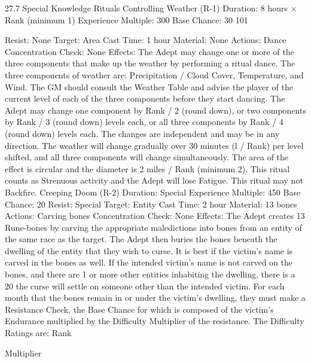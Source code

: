 \documentclass[a4paper]{article}
\begin{document}
\begin{multicols}{3}
27.7 Special Knowledge Rituals
Controlling Weather (R-1)
Duration: 8 hours × Rank (minimum 1)
Experience Multiple: 300
Base Chance: 30%
101

Resist: None
Target: Area
Cast Time: 1 hour
Material: None
Actions: Dance
Concentration Check: None
Effects: The Adept may change one or more of the
three components that make up the weather by
performing a ritual dance. The three components of
weather are: Precipitation / Cloud Cover, Temperature, and Wind. The GM should consult the
Weather Table and advise the player of the current
level of each of the three components before they
start dancing. The Adept may change one component by Rank / 2 (round down), or two components
by Rank / 3 (round down) levels each, or all three
components by Rank / 4 (round down) levels each.
The changes are independent and may be in any
direction. The weather will change gradually over
30 minutes (l / Rank) per level shifted, and all three
components will change simultaneously. The area
of the effect is circular and the diameter is 2 miles /
Rank (minimum 2). This ritual counts as Strenuous
activity and the Adept will lose Fatigue. This ritual
may not Backfire.
Creeping Doom (R-2)
Duration: Special
Experience Multiple: 450
Base Chance: 20%
Resist: Special
Target: Entity
Cast Time: 2 hour
Material: 13 bones
Actions: Carving bones
Concentration Check: None
Effects: The Adept creates 13 Rune-bones by carving the appropriate maledictions into bones from
an entity of the same race as the target. The Adept
then buries the bones beneath the dwelling of the
entity that they wish to curse. It is best if the victim’s name is carved in the bones as well. If the
intended victim’s name is not carved on the bones,
and there are 1 or more other entities inhabiting the
dwelling, there is a 20%
the curse will settle on someone other than the
intended victim. For each month that the bones
remain in or under the victim’s dwelling, they must
make a Resistance Check, the Base Chance for
which is composed of the victim’s Endurance
multiplied by the Difficulty Multiplier of the resistance. The Difficulty Ratings are:
Rank

Multiplier


\end{multicols}
\end{document}
